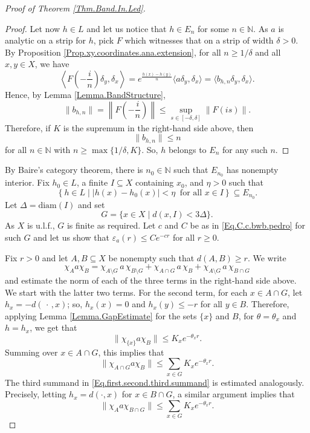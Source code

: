 \documentclass[11pt]{amsart}
\newcommand{\N}{\mathbb{N}}
\newcommand{\eps}{\varepsilon}
\numberwithin{equation}{section}
\theoremstyle{definition}
\theoremstyle{remark}
\begin{document}
\begin{proof}[Proof of Theorem \ref{Thm.Band.In.Led}]
\begin{proof}
Let now $h\in L$ and let us notice  that $h\in E_n$ for some $n\in\N$. As $a$ is analytic on a strip for $h$, pick $F$ which witnesses that on a strip of width $\delta>0$. By Proposition \ref{Prop.xy.coordinates.ana.extension}, for all $n\geq 1/\delta$ and all $x,y\in X$, we have
\[\left\langle F\left(-\frac{i}{n}\right)\delta_y,\delta_x\right\rangle=e^{\frac{h(x)-h(y)}{n}}\langle a\delta_y,\delta_x\rangle=\langle b_{h,n}\delta_y,\delta_x\rangle.\]
Hence, by Lemma \ref{Lemma.BandStructure},
\[\|b_{h,n}\|=\left\|F\left(-\frac{i}{n}\right)\right\|\leq \sup_{s\in [-\delta,\delta]}\|F(is)\|.\]
Therefore, if $K$ is the supremum in the right-hand side above, then
\[\|b_{h,n}\|\leq n\]
for all $n\in\N$ with $n\geq \max\{1/\delta,K\}$. So, $h$ belongs to $E_n$ for any such $n$.
\end{proof}


  By Baire's category theorem, there is $n_0\in\N$ such that $E_{n_0}$ has nonempty interior. Fix $h_0\in L$, a finite $I\subseteq X$ containing $x_0$, and $\eta>0$  such that
\[\left\{h\in L\mid |h(x)-h_0(x)|<\eta\ \text{ for all }x\in I\right\}\subseteq E_{n_0}.\]
 Let $\Delta=\mathrm{diam}(I)$ and set
\[G=\{x\in X\mid d(x,I)< 3\Delta\}.\]
As $X$ is u.l.f., $G$ is finite as required. Let $c$ and $C$ be as in \eqref{Eq.C.c.bwb.pedro} for such $G$ and let us show that $\eps_a(r)\leq Ce^{-cr}$ for all $r\geq 0$.

Fix  $r>0$  and let   $A,B\subseteq X$ be nonempty such that   $d(A,B)\geq r$. We write
\begin{equation}\label{Eq.first.second.third.summand}\chi_Aa\chi_B=\chi_{A\setminus G}\,a\,\chi_{B\setminus G}+\chi_{A\cap G}\,a\,\chi_{B}+\chi_{A\setminus G}\,a\,\chi_{B\cap G}\end{equation}
and estimate the norm of each of the three terms in the right-hand side above. We start with the latter two terms.   For the second term, for each  $x\in A\cap G$,   let $h_x=-d(\,\cdot\,,x)$; so,     $h_x(x)=0$ and $h_x(y)\leq -r$  for all $y\in B$. Therefore,  applying Lemma \ref{Lemma.GapEstimate} for the sets $\{x\}$ and $B$, for $\theta=\theta_x$ and $h=h_x$, we get that \begin{equation*} \|\chi_{\{x\}}a\chi_B\|\leq K_xe^{-\theta_xr}.\end{equation*} Summing over $x\in A\cap G$, this implies that \begin{equation}\label{Eq.28.aug.26.2} \|\chi_{A\cap G}a\chi_B\| \leq  \sum_{x\in G}K_xe^{-\theta_xr}.\end{equation}
The third summand in  \eqref{Eq.first.second.third.summand} is  estimated analogously. Precisely, letting  $h_x=d(\cdot,x)$ for $x\in B\cap G$, a similar argument implies that  \begin{equation}\label{Eq.28.aug.26.3}\|\chi_{A}a\chi_{B\cap G}\| \leq  \sum_{x\in G}K_xe^{-\theta_xr}.\end{equation} 


\end{proof}
\end{document}
